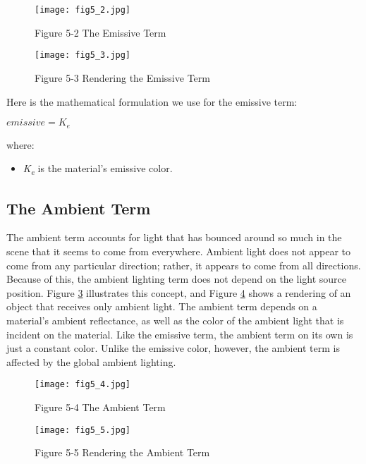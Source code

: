 \documentclass[../main.tex]{subfiles}
\begin{document}
\begin{figure}
    \centering
    \texttt{[image: fig5\_2.jpg]}
    \caption{Figure 5-2 The Emissive Term}
    \label{fig:5-2}
\end{figure}

\begin{figure}
    \centering
    \texttt{[image: fig5\_3.jpg]}
    \caption{Figure 5-3 Rendering the Emissive Term}
    \label{fig:5-3}
\end{figure}

Here is the mathematical formulation we use for the emissive term:

$emissive = K_e$

where:

\begin{itemize}
    \item \textit{K\textsubscript{e}} is the material's emissive color.
\end{itemize}

\subsection*{The Ambient Term}

The ambient term accounts for light that has bounced around so much in the scene that it seems to come from everywhere. Ambient light does not appear to come from any particular direction; rather, it appears to come from all directions. Because of this, the ambient lighting term does not depend on the light source position. Figure \ref{fig:5-4} illustrates this concept, and Figure \ref{fig:5-5} shows a rendering of an object that receives only ambient light. The ambient term depends on a material's ambient reflectance, as well as the color of the ambient light that is incident on the material. Like the emissive term, the ambient term on its own is just a constant color. Unlike the emissive color, however, the ambient term is affected by the global ambient lighting.

\begin{figure}
    \centering
    \texttt{[image: fig5\_4.jpg]}
    \caption{Figure 5-4 The Ambient Term}
    \label{fig:5-4}
\end{figure}

\begin{figure}
    \centering
    \texttt{[image: fig5\_5.jpg]}
    \caption{Figure 5-5 Rendering the Ambient Term}
    \label{fig:5-5}
\end{figure}
\end{document}
